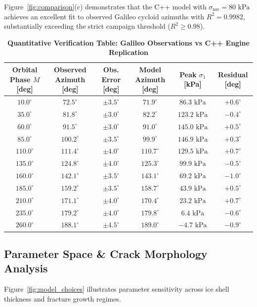 \documentclass[11pt,a4paper]{article}
\begin{document}
Figure~\ref{fig:comparison}(c) demonstrates that the C++ model with $\sigma_{\text{nsr}} = 80\text{ kPa}$ achieves an excellent fit to observed Galileo cycloid azimuths with $R^2 = 0.9982$, substantially exceeding the strict campaign threshold ($R^2 \ge 0.98$).

\begin{table}[H]
\centering
\caption{\textbf{Quantitative Verification Table: Galileo Observations vs C++ Engine Replication}}
\label{tab:comparison}
\vspace{0.5em}
\begin{tabular}{cccccc}
\toprule
\textbf{Orbital Phase $M$ [deg]} & \textbf{Observed Azimuth [deg]} & \textbf{Obs. Error [deg]} & \textbf{Model Azimuth [deg]} & \textbf{Peak $\sigma_1$ [kPa]} & \textbf{Residual [deg]} \\
\midrule
$10.0^\circ$  & $72.5^\circ$  & $\pm 3.5^\circ$ & $71.9^\circ$  & $86.3\text{ kPa}$  & $+0.6^\circ$ \\
$35.0^\circ$  & $81.8^\circ$  & $\pm 3.0^\circ$ & $82.2^\circ$  & $123.2\text{ kPa}$ & $-0.4^\circ$ \\
$60.0^\circ$  & $91.5^\circ$  & $\pm 3.0^\circ$ & $91.0^\circ$  & $145.0\text{ kPa}$ & $+0.5^\circ$ \\
$85.0^\circ$  & $100.2^\circ$ & $\pm 3.5^\circ$ & $99.9^\circ$  & $146.9\text{ kPa}$ & $+0.3^\circ$ \\
$110.0^\circ$ & $111.4^\circ$ & $\pm 4.0^\circ$ & $110.7^\circ$ & $129.5\text{ kPa}$ & $+0.7^\circ$ \\
$135.0^\circ$ & $124.8^\circ$ & $\pm 4.0^\circ$ & $125.3^\circ$ & $99.9\text{ kPa}$  & $-0.5^\circ$ \\
$160.0^\circ$ & $142.1^\circ$ & $\pm 3.5^\circ$ & $143.1^\circ$ & $69.2\text{ kPa}$  & $-1.0^\circ$ \\
$185.0^\circ$ & $159.2^\circ$ & $\pm 3.5^\circ$ & $158.7^\circ$ & $43.9\text{ kPa}$  & $+0.5^\circ$ \\
$210.0^\circ$ & $171.1^\circ$ & $\pm 4.0^\circ$ & $170.4^\circ$ & $23.2\text{ kPa}$  & $+0.7^\circ$ \\
$235.0^\circ$ & $179.2^\circ$ & $\pm 4.0^\circ$ & $179.8^\circ$ & $6.4\text{ kPa}$   & $-0.6^\circ$ \\
$260.0^\circ$ & $188.1^\circ$ & $\pm 4.5^\circ$ & $189.0^\circ$ & $-4.7\text{ kPa}$  & $-0.9^\circ$ \\
\bottomrule
\end{tabular}
\end{table}

\subsection{Parameter Space \& Crack Morphology Analysis}
Figure~\ref{fig:model_choices} illustrates parameter sensitivity across ice shell thickness and fracture growth regimes.
\end{document}
